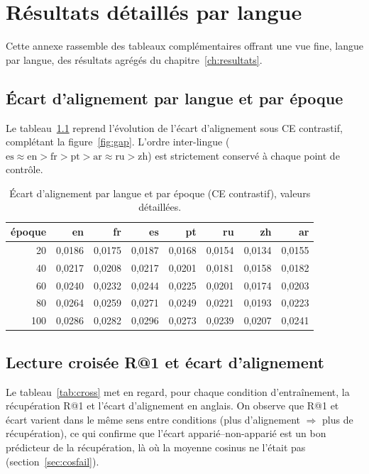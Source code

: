 \documentclass[12pt,a4paper,oneside]{report}
\theoremstyle{definition}
\theoremstyle{plain}
\begin{document}
\chapter{Résultats détaillés par langue}
\label{app:perlangue}

Cette annexe rassemble des tableaux complémentaires offrant une vue fine, langue par
langue, des résultats agrégés du chapitre~\ref{ch:resultats}.

\section{Écart d'alignement par langue et par époque}

Le tableau~\ref{tab:gap-detail} reprend l'évolution de l'écart d'alignement sous CE
contrastif, complétant la figure~\ref{fig:gap}. L'ordre inter-lingue
($\text{es}\approx\text{en}>\text{fr}>\text{pt}>\text{ar}\approx\text{ru}>\text{zh}$)
est strictement conservé à chaque point de contrôle.

\begin{table}[ht]
\centering
\caption{Écart d'alignement par langue et par époque (CE contrastif), valeurs
détaillées.}
\label{tab:gap-detail}
\small
\begin{tabular}{@{}rrrrrrrr@{}}
\toprule
époque & en & fr & es & pt & ru & zh & ar \\
\midrule
20  & 0,0186 & 0,0175 & 0,0187 & 0,0168 & 0,0154 & 0,0134 & 0,0155 \\
40  & 0,0217 & 0,0208 & 0,0217 & 0,0201 & 0,0181 & 0,0158 & 0,0182 \\
60  & 0,0240 & 0,0232 & 0,0244 & 0,0225 & 0,0201 & 0,0174 & 0,0203 \\
80  & 0,0264 & 0,0259 & 0,0271 & 0,0249 & 0,0221 & 0,0193 & 0,0223 \\
100 & 0,0286 & 0,0282 & 0,0296 & 0,0273 & 0,0239 & 0,0207 & 0,0241 \\
\bottomrule
\end{tabular}
\end{table}

\section{Lecture croisée R@1 et écart d'alignement}

Le tableau~\ref{tab:cross} met en regard, pour chaque condition d'entraînement, la
récupération R@1 et l'écart d'alignement en anglais. On observe que R@1 et écart
varient dans le même sens entre conditions (plus d'alignement $\Rightarrow$ plus de
récupération), ce qui confirme que l'écart apparié--non-apparié est un bon
prédicteur de la récupération, là où la moyenne cosinus ne l'était pas
(section~\ref{sec:cosfail}).
\end{document}
